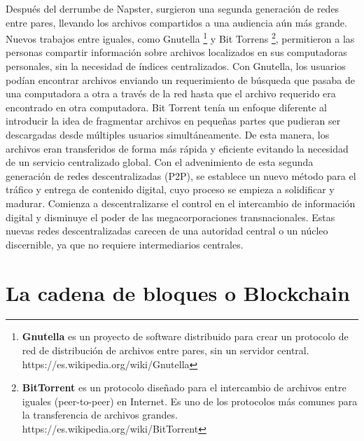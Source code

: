 \documentclass[12pt]{report} %
\begin{document}
Después del derrumbe de Napster, surgieron una segunda generación de redes entre pares, llevando los archivos compartidos a una audiencia aún más grande. Nuevos trabajos entre iguales, como Gnutella \footnote{\textbf{Gnutella} es un proyecto de software distribuido para crear un protocolo de red de distribución de archivos entre pares, sin un servidor central. https://es.wikipedia.org/wiki/Gnutella}  y Bit Torrens \footnote{\textbf{BitTorrent} es un protocolo diseñado para el intercambio de archivos entre iguales (peer-to-peer) en Internet. Es uno de los protocolos más comunes para la transferencia de archivos grandes. https://es.wikipedia.org/wiki/BitTorrent},  permitieron a las personas compartir información sobre archivos localizados en sus computadoras personales, sin la necesidad de índices centralizados. Con Gnutella, los usuarios podían encontrar archivos enviando un requerimiento de búsqueda que pasaba de una computadora a otra a través de la red hasta que el archivo requerido era encontrado en otra computadora. Bit Torrent tenía un enfoque diferente al introducir la idea de fragmentar archivos en pequeñas partes que pudieran ser descargadas desde múltiples usuarios simultáneamente. De esta manera, los archivos eran transferidos de forma más rápida y eficiente evitando la necesidad de un servicio centralizado global.
Con el advenimiento de esta segunda generación de redes descentralizadas (P2P), se establece un nuevo método para el tráfico y entrega de contenido digital, cuyo proceso se empieza a solidificar y madurar. Comienza a descentralizarse el control en el intercambio de información digital y disminuye el poder de las megacorporaciones transnacionales. Estas nuevas redes descentralizadas carecen de una autoridad central o un núcleo discernible, ya que no requiere intermediarios centrales. 


\section{La cadena de bloques o Blockchain}
\label{Blockchain}
\end{document}
